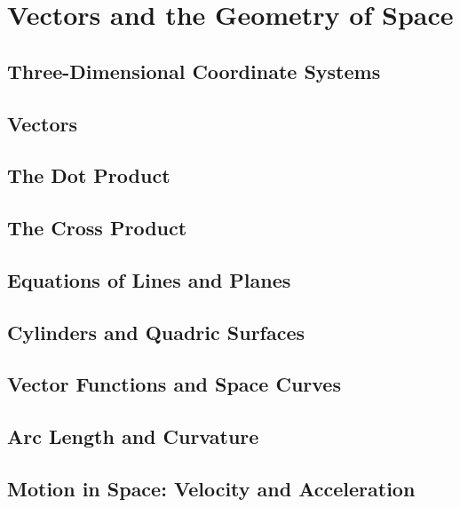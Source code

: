 \setcounter{chapter}{9}
\chapter{Vectors and the Geometry of Space}
    \section{Three-Dimensional Coordinate Systems}
    \section{Vectors}
    \section{The Dot Product}
    \section{The Cross Product}
    \section{Equations of Lines and Planes}
    \section{Cylinders and Quadric Surfaces}
    \section{Vector Functions and Space Curves}
    \section{Arc Length and Curvature}
    \section{Motion in Space: Velocity and Acceleration}